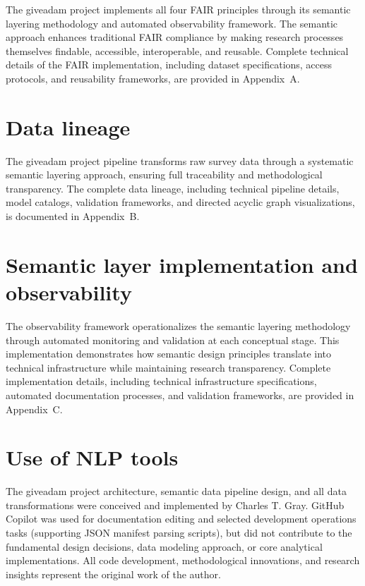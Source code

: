 \documentclass{article}
\begin{document}
The giveadam project implements all four FAIR principles through its semantic layering methodology and automated observability framework. The semantic approach enhances traditional FAIR compliance by making research processes themselves findable, accessible, interoperable, and reusable. Complete technical details of the FAIR implementation, including dataset specifications, access protocols, and reusability frameworks, are provided in Appendix~A.

\section{Data lineage}
\label{sec:data-lineage}

The giveadam project pipeline transforms raw survey data through a systematic semantic layering approach, ensuring full traceability and methodological transparency. The complete data lineage, including technical pipeline details, model catalogs, validation frameworks, and directed acyclic graph visualizations, is documented in Appendix~B.

\section{Semantic layer implementation and observability}
\label{sec:semantic-implementation}

The observability framework operationalizes the semantic layering methodology through automated monitoring and validation at each conceptual stage. This implementation demonstrates how semantic design principles translate into technical infrastructure while maintaining research transparency. Complete implementation details, including technical infrastructure specifications, automated documentation processes, and validation frameworks, are provided in Appendix~C.

\section{Use of NLP tools}

The giveadam project architecture, semantic data pipeline design, and all data transformations were conceived and implemented by Charles T. Gray. GitHub Copilot \cite{copilot} was used for documentation editing and selected development operations tasks (supporting JSON manifest parsing scripts), but did not contribute to the fundamental design decisions, data modeling approach, or core analytical implementations. All code development, methodological innovations, and research insights represent the original work of the author.
\end{document}
